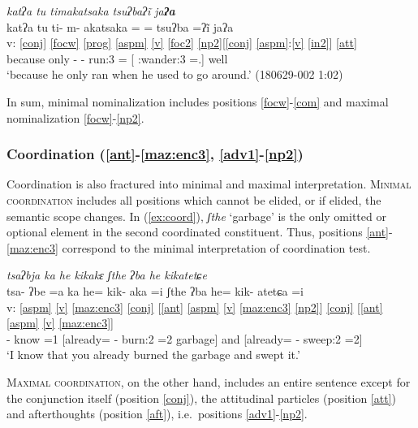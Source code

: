 \documentclass[output=paper]{langscibook}
\begin{document}
\ea \label{ex:nmlz3}
 \textit{\ssn ka\1tʔa\2 tu\1 ti\2ma\4\ssn ka\2tsa\4\st\ssn ka\tlg\3\2 tsu\2\st{}ʔba\2ʔĩ\2 ja\4\textbf{ʔa\2}}\\
\glll {} \ssn ka\1tʔa\2 tu\1 ti\2\ff- m- a\2\ssn ka\2tsa\4\ssn ka\2 =\3\ff{} =\tlg\2 tsu\2ʔba\2 =ʔĩ\3\ff{} ja\2ʔa\2\\
v: \ref{conj} \ref{focw} \ref{prog} \ref{aspm} \ref{v} \ref{foc2} \ref{np2}[\ref{conj} \ref{aspm}:\ref{v} \ref{in2}] \ref{att}\\
{} because only \Prog- \Hab- run:3 =\Foc{} [\Sub{} \Hab:wander:3 =\Pst.\Hab{}] well\\
\glt `because he only ran when he used to go around.' (180629-002 1:02)
\z

In sum, minimal nominalization includes positions \ref{focw}-\ref{com} and maximal nominalization \ref{focw}-\ref{np2}.


\subsubsection{Coordination (\ref{ant}-\ref{maz:enc3}, \ref{adv1}-\ref{np2})}\label{sec:d:subspan3} 
Coordination is also fractured into minimal and maximal interpretation. \textsc{Minimal coordination} includes all positions which cannot be elided, or if elided, the semantic scope changes. In (\ref{ex:coord}), \textit{ʃthe\3} `garbage' is the only omitted or optional element in the second coordinated constituent. Thus, positions \ref{ant}-\ref{maz:enc3} correspond to the minimal interpretation of coordination test.


\ea \label{ex:coord}
 \textit{tsa\2\st{}ʔbja\2\3\1 \ssn{}ka\2 he\2 ki\4ka\2\st{}kɛ\3 \st{}ʃthe\3 ʔba\1 he\2 ki\4ka\2te\2\st{}tɕe\2}\\
 \glll {} tsa\2- ʔbe\2\3 =a\1 \ssn{}ka\2 he\2\ff= ki\2k- a\2ka\3\ff{} =i ʃthe\3\ff{} ʔba\1 he\2\ff= ki\2k- a\2te\2tɕa\2 =i\\
 v: \ref{aspm} \ref{v} \ref{maz:enc3} \ref{conj} [\ref{ant} \ref{aspm} \ref{v} \ref{maz:enc3} \ref{np2}] \ref{conj} [\ref{ant} \ref{aspm} \ref{v} \ref{maz:enc3}]\\
{} \Pfv- know =1\Sg{} \Sub{} [already= \Pfv- burn:2 =2\Sg{} garbage] and [already= \Pfv- sweep:2 =2\Sg]\\
\glt `I know that you already burned the garbage and swept it.'
\z

\textsc{Maximal coordination}, on the other hand, includes an entire sentence except for the conjunction itself (position \ref{conj}), the attitudinal particles (position \ref{att}) and afterthoughts (position \ref{aft}), i.e.~positions \ref{adv1}-\ref{np2}.
\end{document}
